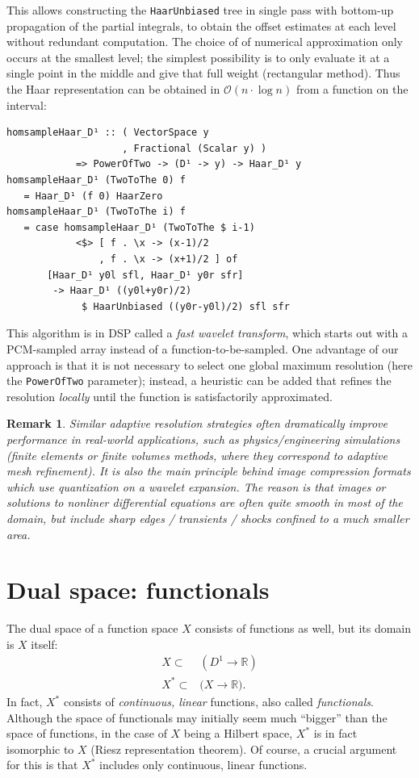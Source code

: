 \documentclass[final,sigplan,review,anonymous]{acmart}\settopmatter{printfolios=true,printccs=false,printacmref=false}
\theoremstyle{acmplain}
\theoremstyle{acmdefinition}
\newtheorem{remark}[theorem]{Remark}
\begin{document}
This allows constructing the \lstinline`HaarUnbiased` tree in single pass with bottom-up propagation of the partial integrals, to obtain the offset estimates at each level without redundant computation.
The choice of of numerical approximation only occurs at the smallest level;
the simplest possibility is to only evaluate it at a single point in the middle and give that full weight (rectangular method).
Thus the Haar representation can be obtained in $\mathcal{O}(n\cdot\log n)$ from a function on the interval:
\begin{lstlisting}
homsampleHaar_D¹ :: ( VectorSpace y
                    , Fractional (Scalar y) )
            => PowerOfTwo -> (D¹ -> y) -> Haar_D¹ y
homsampleHaar_D¹ (TwoToThe 0) f
   = Haar_D¹ (f 0) HaarZero
homsampleHaar_D¹ (TwoToThe i) f
   = case homsampleHaar_D¹ (TwoToThe $ i-1)
            <$> [ f . \x -> (x-1)/2
                , f . \x -> (x+1)/2 ] of
       [Haar_D¹ y0l sfl, Haar_D¹ y0r sfr]
        -> Haar_D¹ ((y0l+y0r)/2)
             $ HaarUnbiased ((y0r-y0l)/2) sfl sfr
\end{lstlisting}
This algorithm is in DSP called a \emph{fast wavelet transform}, which starts out with a PCM-sampled array instead of a function-to-be-sampled.
One advantage of our approach is that it is not necessary to select one global maximum resolution (here the \lstinline`PowerOfTwo` parameter); instead, a heuristic can be added that refines the resolution \emph{locally} until the function is satisfactorily approximated.
\begin{remark}
Similar adaptive resolution strategies often dramatically improve performance in real-world applications, such as physics/engineering simulations (finite elements or finite volumes methods, where they correspond to adaptive mesh refinement).
It is also the main principle behind image compression formats which use quantization on a wavelet expansion.
The reason is that images or solutions to nonliner differential equations are often quite smooth in most of the domain, but include sharp edges / transients / shocks confined to a much smaller area.
\end{remark}

\section{Dual space: functionals}
The dual space of a function space $X$ consists of functions as well, but its domain is $X$ itself:
\begin{align*}
  X \subset& (D^1 \to \mathbb{R})
 \\
  X^\ast \subset& \bigl(X \to \mathbb{R}\bigr).
\end{align*}
In fact, $X^{\ast}$ consists of \emph{continuous, linear} functions, also called \emph{functionals}.
Although the space of functionals may initially seem much “bigger” than the space of functions,
in the case of $X$ being a Hilbert space, $X^\ast$ is in fact isomorphic to $X$ (Riesz representation theorem).
Of course, a crucial argument for this is that $X^\ast$ includes only continuous, linear functions.
\end{document}

